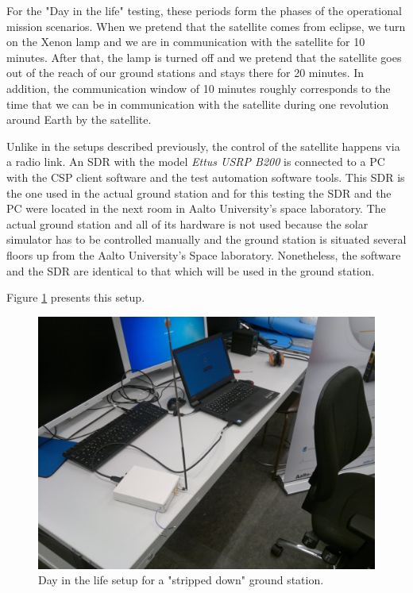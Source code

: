 \documentclass[english,12pt,a4paper,pdftex,elec,utf8]{aaltothesis}
\begin{document}
For the "Day in the life" testing, these periods form the phases of the operational mission scenarios. When we pretend that the satellite comes from eclipse, we turn on the Xenon lamp and we are in communication with the satellite for 10 minutes. After that, the lamp is turned off and we pretend that the satellite goes out of the reach of our ground stations and stays there for 20 minutes. In addition, the communication window of 10 minutes roughly corresponds to the time that we can be in communication with the satellite during one revolution around Earth by the satellite.\par 
Unlike in the setups described previously, the control of the satellite happens via a radio link. An SDR with the model \textit{Ettus USRP B200} is connected to a PC with the CSP client software and the test automation software tools. This SDR is the one used in the actual ground station and for this testing the SDR and the PC were located in the next room in Aalto University's space laboratory. The actual ground station and all of its hardware is not used because the solar simulator has to be controlled manually and the ground station is situated several floors up from the Aalto University's Space laboratory. Nonetheless, the software and the SDR are identical to that which will be used in the ground station.\par 
Figure \ref{dayinlifelink} presents this setup.\par
\begin{figure}[h!]
\centering
\includegraphics[scale=0.3]{daysetuplink}
\caption{Day in the life setup for a "stripped down" ground station.}
\label{dayinlifelink}
\end{figure} 
\clearpage
\end{document}
